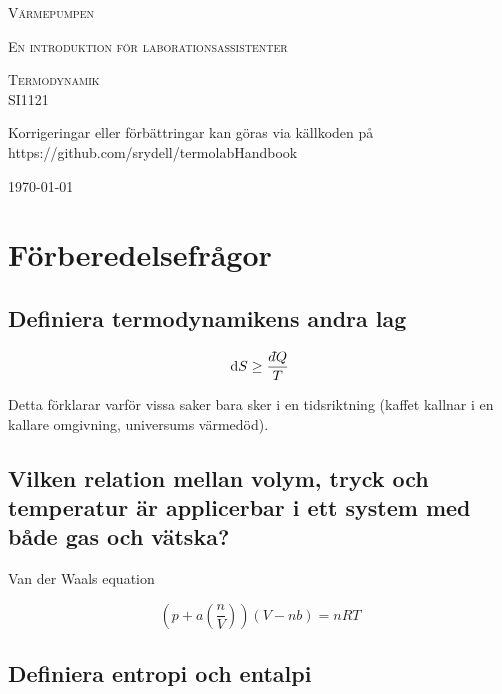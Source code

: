 \documentclass[11pt]{article}
\newcommand{\dbar}{d\hspace*{-0.08em}\bar{}\hspace*{0.1em}}
\begin{document}
\begin{titlepage}
	\centering
	{\scshape\LARGE Värmepumpen \par}
	{\scshape En introduktion för laborationsassistenter \par}
	\vspace{4cm}
	{\scshape\Large Termodynamik \\ SI1121\par}
	\vspace{10cm}
	{ Korrigeringar eller förbättringar kan göras via källkoden på \\ https://github.com/srydell/termolabHandbook\par}
	\vfill
	{\large \today\par}
\end{titlepage}

\section{Förberedelsefrågor}

\subsection{Definiera termodynamikens andra lag}

\begin{equation}
    \mathrm{d}S \geq \frac{\dbar Q}{T}
\end{equation}

Detta förklarar varför vissa saker bara sker i en tidsriktning (kaffet kallnar i en kallare omgivning, universums värmedöd).

\subsection{Vilken relation mellan volym, tryck och temperatur är applicerbar i ett system med både gas och vätska?}

Van der Waals equation

\begin{equation}
    \left ( p + a \left ( \frac{n}{V} \right ) \right ) (V - nb) = nRT
\end{equation}


\subsection{Definiera entropi och entalpi}
\end{document}
